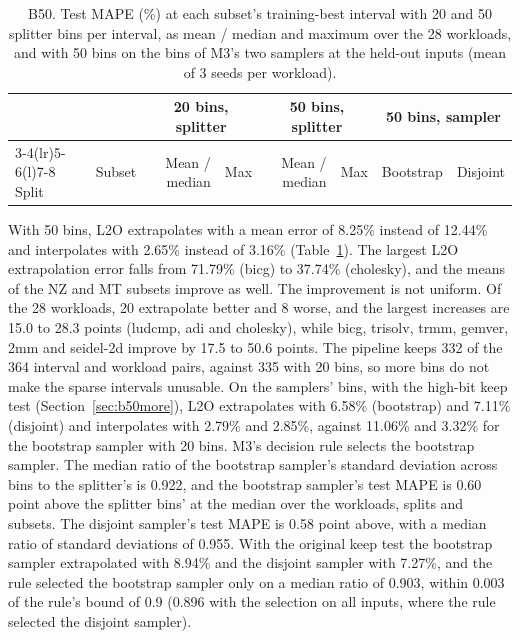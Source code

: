 \documentclass[11pt]{article}
\newcommand{\tabinput}[1]{}
\begin{document}
\begin{table}[htbp]
\centering
\caption{B50. Test MAPE (\%) at each subset's training-best interval with 20 and 50 splitter bins per interval, as
mean / median and maximum over the 28 workloads, and with 50 bins on the bins of M3's two samplers at the held-out
inputs (mean of 3 seeds per workload).}
\label{tab:b50}
\small
\begin{tabular}{@{}llrrrrrr@{}}
\toprule
& & \multicolumn{2}{c}{20 bins, splitter} & \multicolumn{2}{c}{50 bins, splitter} & \multicolumn{2}{c}{50 bins, sampler} \\
\cmidrule(lr){3-4}\cmidrule(lr){5-6}\cmidrule(l){7-8}
Split & Subset & Mean / median & Max & Mean / median & Max & Bootstrap & Disjoint \\
\midrule
\tabinput{b50}
\bottomrule
\end{tabular}
\end{table}

With 50 bins, L2O extrapolates with a mean error of 8.25\% instead of 12.44\% and interpolates with 2.65\% instead
of 3.16\% (Table~\ref{tab:b50}). The largest L2O extrapolation error falls from 71.79\% (bicg) to 37.74\% (cholesky),
and the means of the NZ and MT subsets improve as well. The improvement is not uniform. Of the 28 workloads, 20
extrapolate better and 8 worse, and the largest increases are 15.0 to 28.3 points (ludcmp, adi and cholesky), while
bicg, trisolv, trmm, gemver, 2mm and seidel-2d improve by 17.5 to 50.6 points. The pipeline keeps 332 of the 364 interval and
workload pairs, against 335 with 20 bins, so more bins do not make the sparse intervals unusable. On the samplers'
bins, with the high-bit keep test (Section~\ref{sec:b50more}), L2O extrapolates with 6.58\% (bootstrap) and 7.11\%
(disjoint) and interpolates with 2.79\% and 2.85\%, against 11.06\% and 3.32\% for the bootstrap sampler with 20
bins. M3's decision rule selects the bootstrap sampler. The median ratio of the bootstrap sampler's standard deviation
across bins to the splitter's is 0.922, and the bootstrap sampler's test MAPE is 0.60 point above the splitter bins' at
the median over the workloads, splits and subsets. The disjoint sampler's test MAPE is 0.58 point above, with a median
ratio of standard deviations of 0.955. With the original keep test the bootstrap sampler extrapolated with 8.94\% and
the disjoint sampler with 7.27\%, and the rule selected the bootstrap sampler only on a median ratio of 0.903, within
0.003 of the rule's bound of 0.9 (0.896 with the selection on all inputs, where the rule selected the disjoint
sampler).
\end{document}

